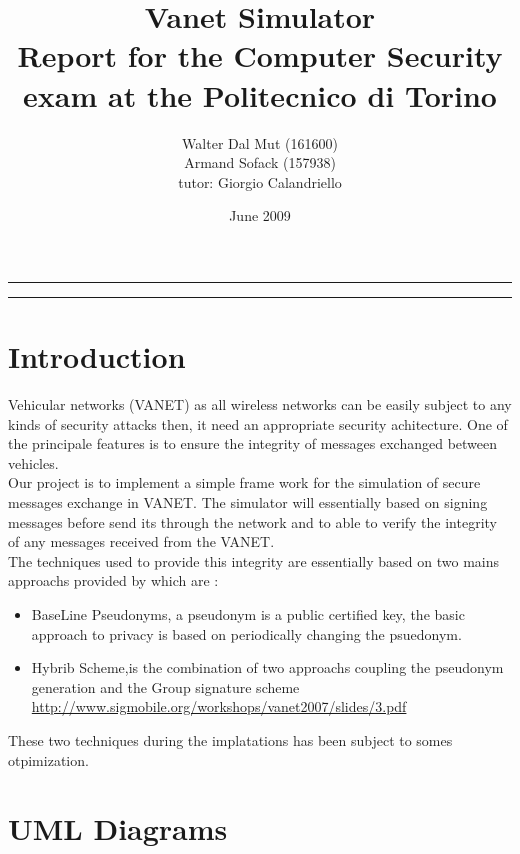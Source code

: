 \documentclass[a4paper,12pt]{article}
\begin{document}
\title{Vanet Simulator
\\
{\normalsize Report for the Computer Security exam at the Politecnico di Torino}
}
\author{Walter Dal Mut (161600)\\Armand Sofack (157938)
\\
{\normalsize tutor: Giorgio Calandriello}
}
\date{June 2009}
\maketitle

\vfill

\rule{\textwidth}{1pt}

\tableofcontents

\rule{\textwidth}{1pt}

\vfill

\newpage
\section{Introduction}
Vehicular networks  (VANET) as all wireless networks can be easily subject to any kinds of security  attacks  then, it need an appropriate security achitecture. One of the principale features is to ensure the integrity of messages exchanged between vehicles.\\
Our project is to implement a simple frame work for the simulation of secure messages exchange in VANET. The simulator will essentially based on  signing  messages  before send its through the network and to able to verify  the integrity of any messages received from the VANET.\\
The techniques used to provide this integrity are essentially based on two mains approachs provided by\cite{calandriello} which are :
\begin{itemize}
\item BaseLine Pseudonyms, a pseudonym is a public certified key,
the basic approach to privacy is based on periodically changing the psuedonym.
\item Hybrib Scheme,is the combination of two approachs coupling the pseudonym generation and the Group signature scheme
\\
\url{http://www.sigmobile.org/workshops/vanet2007/slides/3.pdf}
\end{itemize}
These two techniques during the implatations has been subject to somes otpimization.
\section{UML Diagrams}

\end{document}
